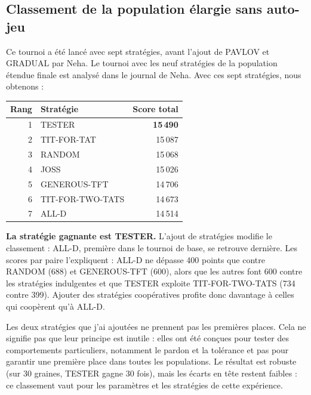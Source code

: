 \documentclass[10pt,a4paper]{article}
\begin{document}
\subsection{Classement de la population élargie sans auto-jeu}
Ce tournoi a été lancé avec sept stratégies, avant l'ajout de PAVLOV et GRADUAL par Neha. Le tournoi avec les neuf
stratégies de la population étendue finale est analysé dans le journal de Neha. Avec ces sept stratégies, nous obtenons :
\begin{center}
\small
\begin{tabular}{@{}rlr@{}}
\toprule
Rang & Stratégie & Score total \\
\midrule
1 & TESTER & \textbf{15\,490} \\
2 & TIT-FOR-TAT & 15\,087 \\
3 & RANDOM & 15\,068 \\
4 & JOSS & 15\,026 \\
5 & GENEROUS-TFT & 14\,706 \\
6 & TIT-FOR-TWO-TATS & 14\,673 \\
7 & ALL-D & 14\,514 \\
\bottomrule
\end{tabular}
\end{center}

\textbf{La stratégie gagnante est TESTER.} L'ajout de stratégies modifie le classement : ALL-D, première dans le tournoi de
base, se retrouve dernière. Les scores par paire l'expliquent : ALL-D ne dépasse 400 points que contre RANDOM (688) et
GENEROUS-TFT (600), alors que les autres font 600 contre les stratégies indulgentes et que TESTER exploite TIT-FOR-TWO-TATS
(734 contre 399). Ajouter des stratégies coopératives profite donc davantage à celles qui coopèrent qu'à ALL-D.

Les deux stratégies que j'ai ajoutées ne prennent pas les premières places. Cela ne signifie pas que leur principe est inutile :
elles ont été conçues pour tester des comportements particuliers, notamment le pardon et la tolérance et pas pour garantir une
première place dans toutes les populations. Le résultat est robuste (sur 30 graines, TESTER gagne 30 fois), mais les écarts en
tête restent faibles : ce classement vaut pour les paramètres et les stratégies de cette expérience.
\end{document}
